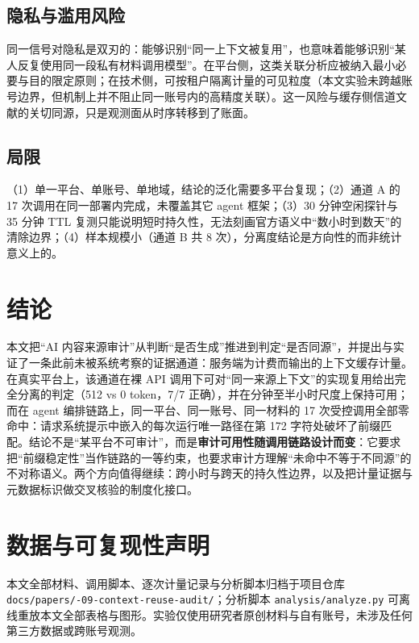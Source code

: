 \documentclass[11pt, a4paper]{ctexart}
\begin{document}
\subsection{隐私与滥用风险}
同一信号对隐私是双刃的：能够识别“同一上下文被复用”，也意味着能够识别“某人反复使用同一段私有材料调用模型”。在平台侧，这类关联分析应被纳入最小必要与目的限定原则；在技术侧，可按租户隔离计量的可见粒度（本文实验未跨越账号边界，但机制上并不阻止同一账号内的高精度关联）。这一风险与缓存侧信道文献的关切同源，只是观测面从时序转移到了账面。

\subsection{局限}
（1）单一平台、单账号、单地域，结论的泛化需要多平台复现；（2）通道 A 的 17 次调用在同一部署内完成，未覆盖其它 agent 框架；（3）30 分钟空闲探针与 35 分钟 TTL 复测只能说明短时持久性，无法刻画官方语义中“数小时到数天”的清除边界；（4）样本规模小（通道 B 共 8 次），分离度结论是方向性的而非统计意义上的。

\section{结论}
\label{sec:conclusion}

本文把“AI 内容来源审计”从判断“是否生成”推进到判定“是否同源”，并提出与实证了一条此前未被系统考察的证据通道：服务端为计费而输出的上下文缓存计量。在真实平台上，该通道在裸 API 调用下可对“同一来源上下文”的实现复用给出完全分离的判定（512 vs 0 token，7/7 正确），并在分钟至半小时尺度上保持可用；而在 agent 编排链路上，同一平台、同一账号、同一材料的 17 次受控调用全部零命中：请求系统提示中嵌入的每次运行唯一路径在第 172 字符处破坏了前缀匹配。结论不是“某平台不可审计”，而是\textbf{审计可用性随调用链路设计而变}：它要求把“前缀稳定性”当作链路的一等约束，也要求审计方理解“未命中不等于不同源”的不对称语义。两个方向值得继续：跨小时与跨天的持久性边界，以及把计量证据与元数据标识做交叉核验的制度化接口。

\section*{数据与可复现性声明}
本文全部材料、调用脚本、逐次计量记录与分析脚本归档于项目仓库 \texttt{docs/\allowbreak papers/-09-context-reuse-audit/}；分析脚本 \texttt{analysis/\allowbreak analyze.py} 可离线重放本文全部表格与图形。实验仅使用研究者原创材料与自有账号，未涉及任何第三方数据或跨账号观测。



\end{document}
